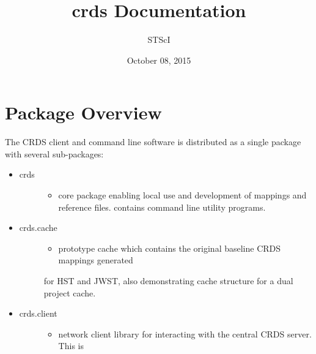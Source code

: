 \documentclass[letterpaper,10pt,english]{sphinxmanual}
\title{crds Documentation}
\date{October 08, 2015}
\author{STScI}
\begin{document}
\maketitle
\tableofcontents
{}\label{index::doc}



\chapter{Package Overview}
\label{installation:package-overview}\label{installation:crds-user-manual}\label{installation::doc}
The CRDS client and command line software is distributed as a single package with
several sub-packages:
\begin{itemize}
\item {} \begin{description}
\item[{crds}] \leavevmode\begin{itemize}
\item {} 
core package enabling local use and development of mappings
and reference files.  contains command line utility programs.

\end{itemize}

\end{description}

\item {} \begin{description}
\item[{crds.cache}] \leavevmode\begin{itemize}
\item {} 
prototype cache which contains the original baseline CRDS mappings generated

\end{itemize}

for HST and JWST,  also demonstrating cache structure for a dual project cache.

\end{description}

\item {} \begin{description}
\item[{crds.client}] \leavevmode\begin{itemize}
\item {} 
network client library for interacting with the central CRDS server.  This is

\end{itemize}


\end{description}
\end{itemize}
\end{document}
